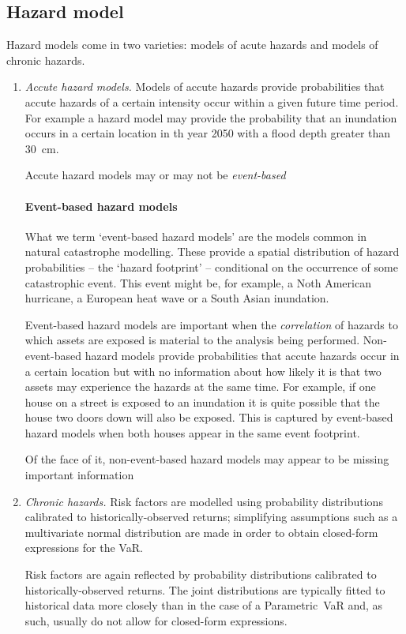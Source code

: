 \documentclass{article}
\begin{document}
\subsection{Hazard model}
Hazard models come in two varieties: models of acute hazards and models of chronic hazards.
\begin{enumerate}[label=\Alph*.]
\item{\emph{Accute hazard models.}}
Models of accute hazards provide probabilities that accute hazards of a certain intensity occur within a given future time period. For example a hazard model may provide the probability that an inundation occurs in a certain location in th year 2050 with a flood depth greater than 30~cm. 

Accute hazard models may or may not be \emph{event-based}
\paragraph{Event-based hazard models}
What we term `event-based hazard models' are the models common in natural catastrophe modelling. These provide a spatial distribution of hazard probabilities -- the `hazard footprint' -- conditional on the occurrence of some catastrophic event. This event might be, for example, a Noth American hurricane, a European heat wave or a South Asian inundation. 

Event-based hazard models are important when the \emph{correlation} of hazards to which assets are exposed is material to the analysis being performed. Non-event-based hazard models provide probabilities that accute hazards occur in a certain location but with no information about how likely it is that two assets may experience the hazards at the same time. For example, if one house on a street is exposed to an inundation it is quite possible that the house two doors down will also be exposed. This is captured by event-based hazard models when both houses appear in the same event footprint.

Of the face of it, non-event-based hazard models may appear to be missing important information  



\item{\emph{Chronic hazards.}}
Risk factors are modelled using probability distributions calibrated to historically-observed returns; simplifying assumptions such as a multivariate normal distribution are made in order to obtain closed-form expressions for the VaR.

Risk factors are again reflected by probability distributions calibrated to historically-observed returns. The joint distributions are typically fitted to historical data more closely than in the case of a Parametric~VaR and, as such, usually do not allow for closed-form expressions.

\end{enumerate}
\end{document}
